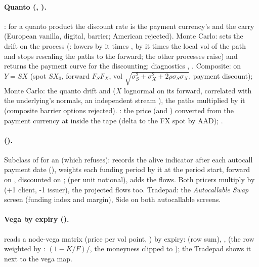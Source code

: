 \paragraph{Quanto (, ).} : for a quanto product the
discount rate is the payment currency's and the carry  (European vanilla,
digital, barrier; American rejected). Monte Carlo:  sets the drift on the process
(:  lowers  by it times
,  by it times the local vol of the path and stops rescaling the paths to the
forward; the other processes raise) and returns the payment curve for the discounting; diagnostics
, . Composite:  on $Y = S X$
(spot $S X_0$, forward $F_S F_X$, vol $\sqrt{\sigma_S^2 + \sigma_X^2 + 2\rho\sigma_S\sigma_X}$, payment discount);
Monte Carlo: the quanto drift and  ($X$ lognormal on its forward, correlated with the
underlying's normals, an independent stream \code{[seed, 1]}), the paths multiplied by it (composite barrier options
rejected). : the price (and ) converted from
the payment currency at  inside the tape (delta to the FX spot by AAD);
.

\paragraph{ ().} Subclass of  for an
 (which  refuses):  records the alive indicator after
each autocall payment date (),  weights each funding period by it at the period start,
forward on , discounted on ;
 (per unit notional),  adds the  flows. Both pricers
multiply by  (+1 client, -1 issuer), the projected flows too. Tradepad: the
\emph{Autocallable Swap} screen (funding index and margin), Side on both autocallable screens.

\paragraph{Vega by expiry ().}  reads a node-vega
matrix (price per vol point, ) by expiry:  (row sum),
,  (the row weighted by : $(1 - K/F)/$, the
moneyness clipped to ); the Tradepad shows it next to the vega map. 

